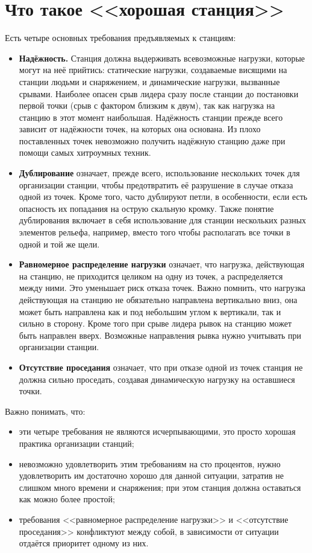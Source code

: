 \documentclass[fleqn, 12pt]{extarticle}
\begin{document}
\section{Что такое <<хорошая станция>>}
	Есть четыре основных требования предъявляемых к станциям:
    \begin{itemize}
        \item \textbf{Надёжность.} Станция должна выдерживать всевозможные нагрузки, которые могут на неё прийтись: статические нагрузки, создаваемые висящими на станции людьми
                и снаряжением, и динамические нагрузки, вызванные срывами. Наиболее опасен срыв лидера сразу после станции до постановки первой точки (срыв с фактором близким к двум),
                так как нагрузка на станцию в этот момент наибольшая. Надёжность станции прежде всего зависит от надёжности точек, на которых она основана. 
                Из плохо поставленных точек невозможно получить надёжную станцию даже при помощи самых хитроумных техник.
        \item \textbf{Дублирование} означает, прежде всего, использование нескольких точек для организации станции, чтобы предотвратить её разрушение в случае отказа одной из точек. 
                Кроме того, часто дублируют петли, в особенности, если есть опасность их попадания на острую скальную кромку. Также понятие дублирования включает в себя использование 
                для станции нескольких разных элементов рельефа, например, вместо того чтобы располагать все точки в одной и той же щели.
        \item \textbf{Равномерное распределение нагрузки} означает, что нагрузка, действующая на станцию, не приходится целиком на одну из точек, а распределяется между ними. 
                Это уменьшает риск отказа точек. Важно помнить, что нагрузка действующая на станцию не обязательно направлена вертикально вниз, она может быть направлена как 
                и под небольшим углом к вертикали, так и сильно в сторону. Кроме того при срыве лидера рывок на станцию может быть направлен вверх. Возможные направления рывка 
                нужно учитывать при организации станции.
        \item \textbf{Отсутствие проседания} означает, что при отказе одной из точек станция не должна сильно проседать, создавая динамическую нагрузку на оставшиеся точки.
    \end{itemize}
    
    Важно понимать, что:
    \begin{itemize}
        \item эти четыре требования не являются исчерпывающими, это просто хорошая практика организации станций;
        \item невозможно удовлетворить этим требованиям на сто процентов, нужно удовлетворить им достаточно хорошо для данной ситуации, затратив не слишком много времени и снаряжения; 
              при этом станция должна оставаться как можно более простой;
        \item требования <<равномерное распределение нагрузки>> и <<отсутствие проседания>> конфликтуют между собой, в зависимости от ситуации отдаётся приоритет одному из них.
    \end{itemize}
\end{document}
